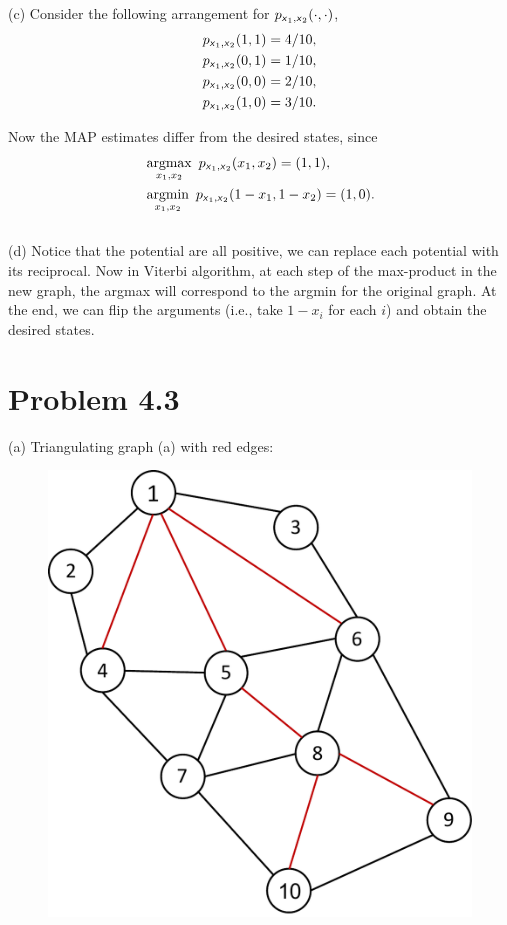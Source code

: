 \documentclass{article}
\newcommand{\s}[1]{\textsf{\textit{#1}}}
\newcommand{\qeds}{\hfill\qedsymbol}
\DeclareMathOperator*{\argmax}{argmax}
\DeclareMathOperator*{\argmin}{argmin}
\begin{document}
\noindent
(c)
%
Consider the following arrangement for $p_{\s{x}_1, \s{x}_2}(\cdot, \cdot)$,
\begin{align*}
	p_{\s{x}_1, \s{x}_2}(1, 1) &= 4/10,\\
	p_{\s{x}_1, \s{x}_2}(0, 1) &= 1/10,\\
	p_{\s{x}_1, \s{x}_2}(0, 0) &= 2/10,\\
	p_{\s{x}_1, \s{x}_2}(1, 0) &= 3/10.
\end{align*}

Now the MAP estimates differ from the desired states, since
\begin{align*}
	&\argmax_{x_1, x_2}\ p_{\s{x}_1, \s{x}_2}(x_1, x_2) = (1, 1),\\
	&\argmin_{x_1, x_2}\ p_{\s{x}_1, \s{x}_2}(1-x_1, 1-x_2) = (1, 0).
\end{align*}\qeds
\\

\noindent
(d)
%
Notice that the potential are all positive, we can replace each potential with its reciprocal.
Now in Viterbi algorithm, at each step of the max-product in the new graph, the argmax will correspond
to the argmin for the original graph. At the end, we can flip the arguments (i.e., take $1-x_i$ for each $i$)
and obtain the desired states.

\pagebreak
\section*{Problem 4.3}
(a)
%
Triangulating graph (a) with red edges:
\begin{figure}[h]
  \centering
  \includegraphics[width=0.25\columnwidth]{3a1.pdf}
    \vspace{-0.1cm}
\end{figure}
\end{document}
